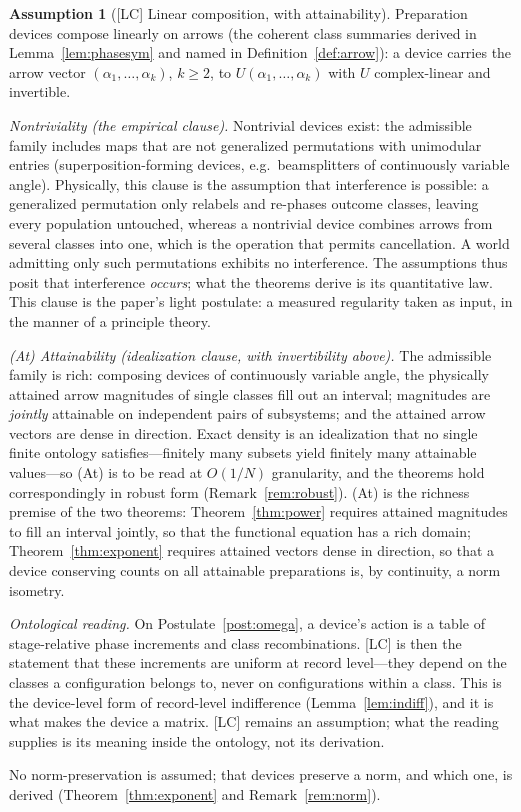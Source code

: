 \documentclass[11pt]{article}
\theoremstyle{definition}
\newtheorem{assumption}{Assumption}
\theoremstyle{remark}
\begin{document}
\begin{assumption}[{[LC]} Linear composition, with attainability]\label{ass:lc}
Preparation devices compose linearly on arrows (the coherent class summaries derived in Lemma~\ref{lem:phasesym} and named in Definition~\ref{def:arrow}): a device carries the arrow vector $(\alpha_1, \dots, \alpha_k)$, $k \ge 2$, to $U(\alpha_1, \dots, \alpha_k)$ with $U$ complex-linear and invertible.

\emph{Nontriviality (the empirical clause).} Nontrivial devices exist: the admissible family includes maps that are not generalized permutations with unimodular entries (superposition-forming devices, e.g.\ beamsplitters of continuously variable angle). Physically, this clause is the assumption that interference is possible: a generalized permutation only relabels and re-phases outcome classes, leaving every population untouched, whereas a nontrivial device combines arrows from several classes into one, which is the operation that permits cancellation. A world admitting only such permutations exhibits no interference. The assumptions thus posit that interference \emph{occurs}; what the theorems derive is its quantitative law. This clause is the paper's light postulate: a measured regularity taken as input, in the manner of a principle theory.

\emph{(At) Attainability (idealization clause, with invertibility above).} The admissible family is rich: composing devices of continuously variable angle, the physically attained arrow magnitudes of single classes fill out an interval; magnitudes are \emph{jointly} attainable on independent pairs of subsystems; and the attained arrow vectors are dense in direction. Exact density is an idealization that no single finite ontology satisfies---finitely many subsets yield finitely many attainable values---so (At) is to be read at $O(1/N)$ granularity, and the theorems hold correspondingly in robust form (Remark~\ref{rem:robust}). (At) is the richness premise of the two theorems: Theorem~\ref{thm:power} requires attained magnitudes to fill an interval jointly, so that the functional equation has a rich domain; Theorem~\ref{thm:exponent} requires attained vectors dense in direction, so that a device conserving counts on all attainable preparations is, by continuity, a norm isometry.

\emph{Ontological reading.} On Postulate~\ref{post:omega}, a device's action is a table of stage-relative phase increments and class recombinations. [LC] is then the statement that these increments are uniform at record level---they depend on the classes a configuration belongs to, never on configurations within a class. This is the device-level form of record-level indifference (Lemma~\ref{lem:indiff}), and it is what makes the device a matrix. [LC] remains an assumption; what the reading supplies is its meaning inside the ontology, not its derivation.

No norm-preservation is assumed; that devices preserve a norm, and which one, is derived (Theorem~\ref{thm:exponent} and Remark~\ref{rem:norm}).
\end{assumption}
\end{document}
